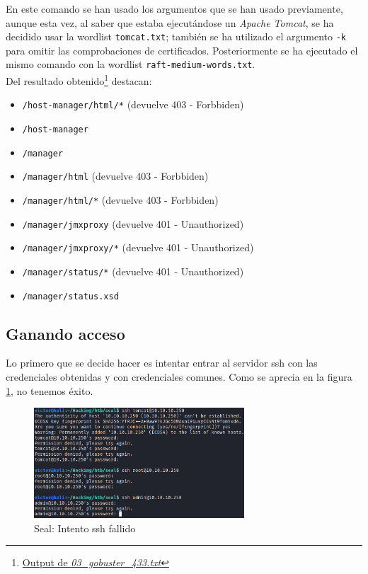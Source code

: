 En este comando se han usado los argumentos que se han usado previamente, aunque esta vez, al saber que estaba ejecutándose un \textit{Apache Tomcat}, se ha decidido usar la wordlist \texttt{tomcat.txt}; también se ha utilizado el argumento \texttt{-k} para omitir las comprobaciones de certificados. Posteriormente se ha ejecutado el mismo comando con la wordlist \texttt{raft-medium-words.txt}.\\

Del resultado obtenido\footnote{\href{https://github.com/VictorNS69/TFM/blob/main/machines/seal/03_gobuster_433.txt}{Output de \textit{03\_gobuster\_433.txt}}} destacan:

\begin{itemize}
    \item \texttt{/host-manager/html/*} (devuelve 403 - Forbbiden)
    \item \texttt{/host-manager}
    \item \texttt{/manager}
    \item \texttt{/manager/html} (devuelve 403 - Forbbiden)
    \item \texttt{/manager/html/*} (devuelve 403 - Forbbiden)
    \item \texttt{/manager/jmxproxy} (devuelve 401 - Unauthorized)
    \item \texttt{/manager/jmxproxy/*} (devuelve 401 - Unauthorized)
    \item \texttt{/manager/status/*} (devuelve 401 - Unauthorized)
    \item \texttt{/manager/status.xsd}
\end{itemize}

\subsection{Ganando acceso}

Lo primero que se decide hacer es intentar entrar al servidor \acrshort{ssh} con las credenciales obtenidas y con credenciales comunes. Como se aprecia en la figura \ref{fig:seal-ssh-facil}, no tenemos éxito.

\begin{figure}[h]
    \centering
    \includegraphics[width=0.70\textwidth]{images/machines/seal/ssh-tomcat.png}
    \caption{Seal: Intento \acrshort{ssh} fallido}
    \label{fig:seal-ssh-facil}
\end{figure}

